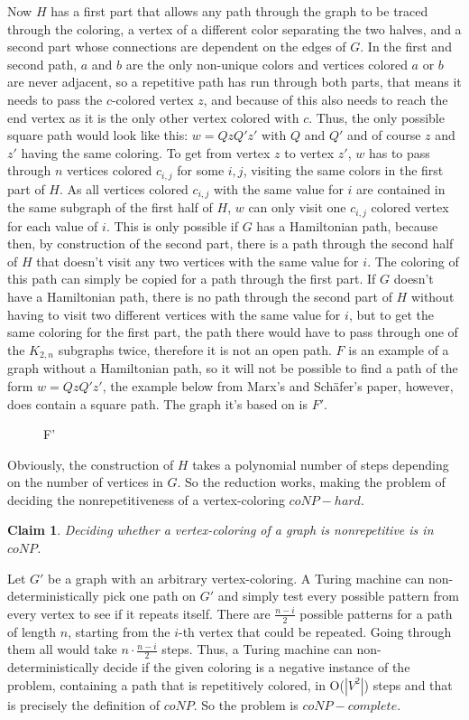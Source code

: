 \documentclass[12pt,a4paper]{article}
\newtheorem{claim}{Claim}
\begin{document}
Now $H$ has a first part that allows any path through the graph to be traced through the coloring, a vertex of a different color separating the two halves, and a second part whose connections are dependent on the edges of $G$. In the first and second path, $a$ and $b$ are the only non-unique colors and vertices colored $a$ or $b$ are never adjacent, so a repetitive path has run through both parts, that means it needs to pass the $c$-colored vertex $z$, and because of this also needs to reach the end vertex as it is the only other vertex colored with $c$. Thus, the only possible square path would look like this: $w = QzQ'z'$ with $Q$ and $Q'$ and of course $z$ and $z'$ having the same coloring. To get from vertex $z$ to vertex $z'$, $w$ has to pass through $n$ vertices colored $c_{i,j}$ for some $i,j$, visiting the same colors in the first part of $H$. As all vertices colored $c_{i,j}$ with the same value for $i$ are contained in the same subgraph of the first half of $H$, $w$ can only visit one $c_{i,j}$ colored vertex for each value of $i$. This is only possible if $G$ has a Hamiltonian path, because then, by construction of the second part, there is a path through the second half of $H$ that doesn't visit any two vertices with the same value for $i$. The coloring of this path can simply be copied for a path through the first part. If $G$ doesn't have a Hamiltonian path, there is no path 
through the second part of $H$ without having to visit two different vertices with the same value for $i$, but to get the same coloring for the first part, the path there would have to pass through one of the $K_{2,n}$ subgraphs twice, therefore it is not an open path. $F$ is an example of a graph without a Hamiltonian path, so it will not be possible to find a path of the form $w = QzQ'z'$, the example below from Marx's and Schäfer's paper, however, does contain a square path. The graph it's based on is $F'$. 
\newline
\begin{figure}[h]
	
	\caption{F'}
\end{figure}
\newline
Obviously, the construction of $H$ takes a polynomial number of steps depending on the number of vertices in $G$. So the reduction works, making the problem of deciding the nonrepetitiveness of a vertex-coloring $coNP-hard$. 
\begin{claim}
Deciding whether a vertex-coloring of a graph is nonrepetitive is in $coNP$.
\end{claim} 
Let $G'$ be a graph with an arbitrary vertex-coloring. A Turing machine can non-deterministically pick one path on $G'$ and simply test every possible pattern from every vertex to see if it repeats itself. There are $\frac{n - i}{2}$ possible patterns for a path of length $n$, starting from the $i$-th vertex that could be repeated. Going through them all would take $n \cdot \frac{n - i}{2}$ steps. Thus, a Turing machine can non-deterministically decide if the given coloring is a negative instance of the problem, containing a path that is repetitively colored,  in O($|V^2|$) steps and that is precisely the definition of $coNP$. 
\newline
So the problem is $coNP-complete$.
\end{document}
